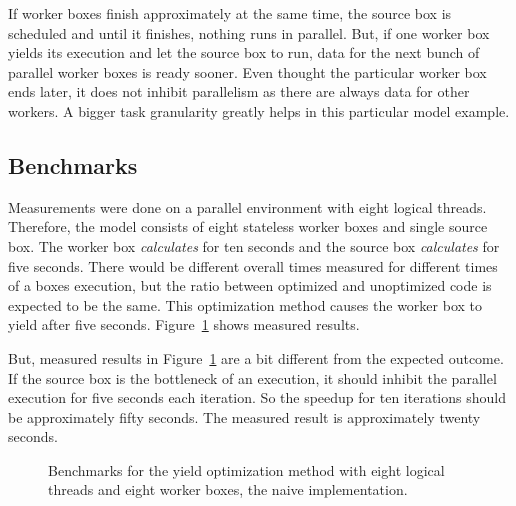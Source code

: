 If worker boxes finish approximately at the same time, the source box is scheduled and until it finishes, nothing runs in parallel. But, if one worker box yields its execution and let the source box to run, data for the next bunch of parallel worker boxes is ready sooner. Even thought the particular worker box ends later, it does not inhibit parallelism as there are always data for other workers. A bigger task granularity greatly helps in this particular model example.

\subsection{Benchmarks}
Measurements were done on a parallel environment with eight logical threads. Therefore, the model consists of eight stateless worker boxes and single source box. The worker box \textit{calculates} for ten seconds and the source box \textit{calculates} for five seconds. There would be different overall times measured for different times of a boxes execution, but the ratio between optimized and unoptimized code is expected to be the same. This optimization method causes the worker box to yield after five seconds. Figure~\ref{yield-bench} shows measured results.

But, measured results in Figure~\ref{yield-bench} are a bit different from the expected outcome. If the source box is the bottleneck of an execution, it should inhibit the parallel execution for five seconds each iteration. So the speedup for ten iterations should be approximately fifty seconds. The measured result is approximately twenty seconds.

\begin{figure}[h!]
\vspace{.5cm}
\centering
{}
\caption{Benchmarks for the yield optimization method with eight logical threads and eight worker boxes, the naive implementation.}
\label{yield-bench}
\end{figure}

